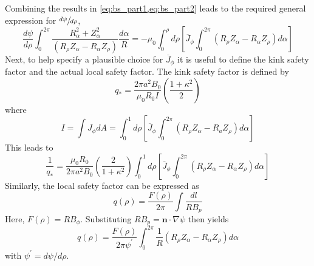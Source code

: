 Combining the results in \cref{eq:bs_part1,eq:bs_part2} leads to the required general expression for $\sfrac{ d\psi }{ d \rho }$,
\begin{equation}
\label{eq:bs_parta}
\frac { d \psi } { d \rho } \int _ { 0 } ^ { 2 \pi } \frac { R _ { \alpha } ^ { 2 } + Z _ { \alpha } ^ { 2 } } { \left( R _ { \rho } Z _ { \alpha } - R _ { \alpha } Z _ { \rho } \right) } \frac { d \alpha } { R } = - \mu _ { 0 } \int _ { 0 } ^ { \rho } d \rho \left[ \overline { J } _ { \phi } \int _ { 0 } ^ { 2 \pi } \left( R _ { \rho } Z _ { \alpha } - R _ { \alpha } Z _ { \rho } \right) d \alpha \right]
\end{equation}
Next, to help specify a plausible choice for $\overline { J } _ { \phi } $ it is useful to define the kink safety factor and the actual local safety factor. The kink safety factor is defined by
\begin{equation}
q _ { * } = \frac { 2 \pi a ^ { 2 } B _ { 0 } } { \mu _ { 0 } R _ { 0 } I } \left( \frac { 1 + \kappa ^ { 2 } } { 2 } \right)
\end{equation}
where
\begin{equation}
I = \int J _ { \phi } d A = \int _ { 0 } ^ { 1 } d \rho \left[ \overline { J } _ { \phi } \int _ { 0 } ^ { 2 \pi } \left( R _ { \rho } Z _ { \alpha } - R _ { a } Z _ { \rho } \right) d \alpha \right]
\end{equation}
This leads to
\begin{equation}
\label{eq:bs_partb}
\frac { 1 } { q _ { * } } = \frac { \mu _ { 0 } R _ { 0 } } { 2 \pi a ^ { 2 } B _ { 0 } } \left( \frac { 2 } { 1 + \kappa ^ { 2 } } \right) \int _ { 0 } ^ { 1 } d \rho \left[ \overline { J } _ { \phi } \int _ { 0 } ^ { 2 \pi } \left( R _ { \rho } Z _ { \alpha } - R _ { \alpha } Z _ { \rho } \right) d \alpha \right]
\end{equation}
Similarly, the local safety factor can be expressed as
\begin{equation}
q ( \rho ) = \frac { F ( \rho ) } { 2 \pi } \int \frac { d l } { R B _ { p } }
\end{equation}
Here, $F ( \rho ) = R B _ { \phi }$. Substituting $R B _ { p } = \mathbf { n } \cdot \nabla \psi$ then yields
\begin{equation}
\label{eq:bs_partc}
q ( \rho ) = \frac { F ( \rho ) } { 2 \pi \psi ^ { \prime } } \int _ { 0 } ^ { 2 \pi } \frac { 1 } { R } \left( R _ { \rho } Z _ { \alpha } - R _ { \alpha } Z _ { \rho } \right) d \alpha
\end{equation}
with $\psi ^ { \prime } = d \psi / d \rho$.

